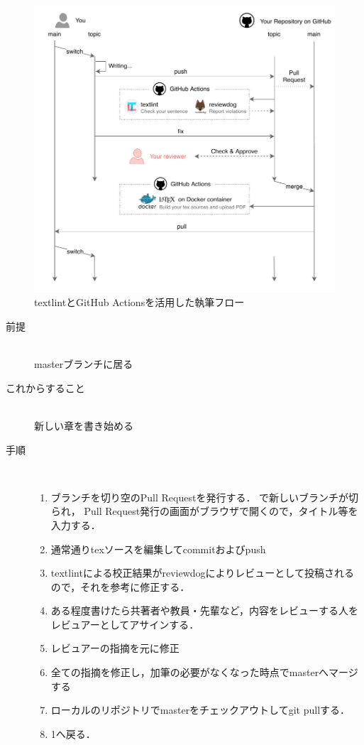 \documentclass[main]{subfiles}
\begin{document}
\begin{figure}[h]
    \centering
    \includegraphics[keepaspectratio,scale=1.0]{../figures/textlint_workflow.pdf}
    \caption{textlintとGitHub Actionsを活用した執筆フロー}
    \label{fig:workflow}
\end{figure}

\begin{description}
    \item[前提]　\\
        masterブランチに居る
    \item[これからすること]　\\
        新しい章を書き始める
    \item[手順]　\\
        \begin{enumerate}
            \item ブランチを切り空のPull Requestを発行する．
                で新しいブランチが切られ，
                Pull Request発行の画面がブラウザで開くので，タイトル等を入力する．
            \item 通常通りtexソースを編集してcommitおよびpush
            \item textlintによる校正結果がreviewdogによりレビューとして投稿されるので，それを参考に修正する．
            \item ある程度書けたら共著者や教員・先輩など，内容をレビューする人をレビュアーとしてアサインする．
            \item レビュアーの指摘を元に修正
            \item 全ての指摘を修正し，加筆の必要がなくなった時点でmasterへマージする
            \item ローカルのリポジトリでmasterをチェックアウトしてgit pullする．
            \item 1へ戻る．
        \end{enumerate}
\end{description}
\end{document}
